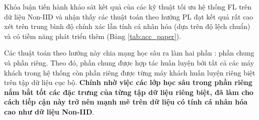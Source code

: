 
Khóa luận tiến hành khảo sát kết quả của các kỹ thuật tối ưu hệ thống FL trên dữ liệu Non-IID và nhận thấy các thuật toán theo hướng PL đạt kết quả rất cao xét trên trung bình độ chính xác lẫn tính cá nhân hóa (dựa trên độ lệch chuẩn) và có tiềm năng phát triển thêm (Bảng \ref{tab:acc_paper}).

\begin{table}[H]
    \centering
    \caption{Độ chính xác (\%) của các hệ thống FL trên dữ liệu Non-IID của tập dữ liệu CIFAR-10 \cite{shamsian2021personalized}. Các thuật toán PL được in đậm.}
    \label{tab:acc_paper}
\end{table}

Các thuật toán theo hướng này chia mạng học sâu ra làm hai phần \cite{zhu2021federated}: phần chung và phần riêng. Theo đó, phần chung được hợp tác huấn luyện bởi tất cả các máy khách trong hệ thống còn phần riêng được từng máy khách huấn luyện riêng biệt trên tập dữ liệu cục bộ. \textbf{Chính nhờ việc các lớp học sâu trong phần riêng nắm bắt tốt các đặc trưng của từng tập dữ liệu riêng biệt, đã làm cho cách tiếp cận này trở nên mạnh mẽ trên dữ liệu có tính cá nhân hóa cao như dữ liệu Non-IID}.

